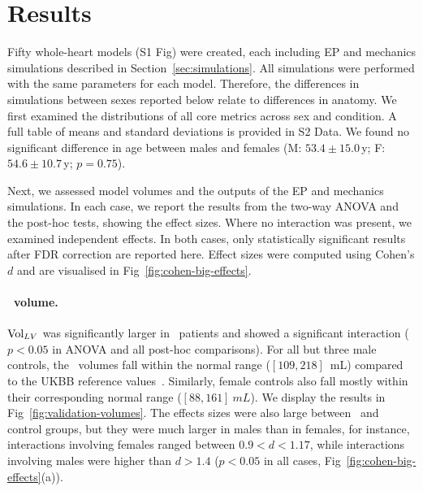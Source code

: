 \section{Results}
Fifty whole-heart models (S1 Fig) were created,
each including EP and mechanics simulations described in Section~\ref{sec:simulations}.
All simulations were performed with the same parameters for each model.
Therefore, the differences in simulations between sexes reported below relate to 
differences in anatomy.
We first examined the distributions of all core metrics across sex and condition.
A full table of means and standard deviations is provided in S2 Data.
We found no significant difference in age between males and females
(M: $53.4\pm15.0$\,y; F: $54.6\pm10.7$\,y; $p=0.75$). 



Next, we assessed model volumes and the outputs of the EP and mechanics simulations.
In each case, we report the results from the two-way ANOVA and the post-hoc tests, showing 
the effect sizes. 
Where no interaction was present, we examined independent effects.
In both cases, only statistically significant results after FDR correction are reported here.
Effect sizes were computed using Cohen’s $d$ and are visualised in Fig~\ref{fig:cohen-big-effects}.

\paragraph{\LV\ volume.} 
$\mathrm{Vol}_{LV}$ was significantly larger in \HF\ patients and showed a significant interaction 
($p<0.05$ in ANOVA and all post-hoc comparisons).
For all but three male controls, the \LV\ volumes fall within the normal range 
($[109,218]$~mL)
compared to the UKBB reference values~\cite{petersen-2017-reference}.
Similarly, female controls also fall mostly within their corresponding normal range
($[88,161]~mL$).
We display the results in Fig~\ref{fig:validation-volumes}.
The effects sizes were also large between \HF\ and control groups, but they were much 
larger in males than in females, for instance, 
interactions involving females ranged between $0.9<d<1.17$, 
while interactions involving males were higher than $d>1.4$ 
($p<0.05$ in all cases, Fig~\ref{fig:cohen-big-effects}(a)).

